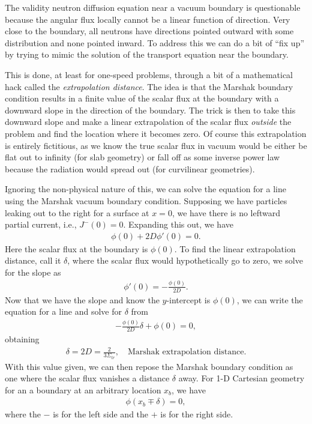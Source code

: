 The validity neutron diffusion equation near a vacuum boundary is questionable because the angular flux locally cannot be a linear function of direction. Very close to the boundary, all neutrons have directions pointed outward with some distribution and none pointed inward. To address this we can do a bit of ``fix up'' by trying to mimic the solution of the transport equation near the boundary. 

This is done, at least for one-speed problems, through a bit of a mathematical hack called the \emph{extrapolation distance}. The idea is that the Marshak boundary condition results in a finite value of the scalar flux at the boundary with a downward slope in the direction of the boundary. The trick is then to take this downward slope and make a linear extrapolation of the scalar flux \emph{outside} the problem and find the location where it becomes zero. Of course this extrapolation is entirely fictitious, as we know the true scalar flux in vacuum would be either be flat out to infinity (for slab geometry) or fall off as some inverse power law because the radiation would spread out (for curvilinear geometries).

Ignoring the non-physical nature of this, we can solve the equation for a line using the Marshak vacuum boundary condition. Supposing we have particles leaking out to the right for a surface at $x = 0$, we have there is no leftward partial current, i.e., $J^-(0) = 0$. Expanding this out, we have
\begin{align}
  \phi(0) + 2D \phi'(0) = 0.
\end{align}
Here the scalar flux at the boundary is $\phi(0)$. To find the linear extrapolation distance, call it $\delta$, where the scalar flux would hypothetically go to zero, we solve for the slope as
\begin{align}
  \phi'(0) = -\frac{\phi(0)}{2D} .
\end{align}
Now that we have the slope and know the $y$-intercept is $\phi(0)$, we can write the equation for a line and solve for $\delta$ from
\begin{align}
   -\frac{\phi(0)}{2D} \delta + \phi(0) = 0,
\end{align}
obtaining 
\begin{align}
  \delta = 2 D = \frac{2}{3\Sigma_{tr}} , \quad \text{Marshak extrapolation distance.}
\end{align}
With this value given, we can then repose the Marshak boundary condition as one where the scalar flux vanishes a distance $\delta$ away. For 1-D Cartesian geometry for an a boundary at an arbitrary location $x_b$, we have
\begin{align}
  \phi(x_b \mp \delta) = 0 ,
\end{align}
where the $-$ is for the left side and the $+$ is for the right side.

